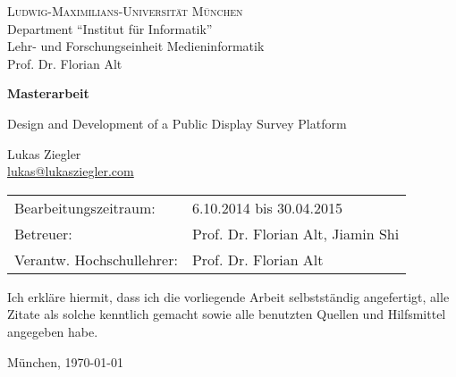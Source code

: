 \documentclass[11pt,a4paper,twoside]{article}
\begin{document}
\pagestyle{empty} %

\begin{center}
\textsc{Ludwig-Maximilians-Universit\"at M\"unchen}\\
Department ``Institut f\"ur Informatik''\\
Lehr- und Forschungseinheit Medieninformatik\\
Prof. Dr. Florian Alt

\vspace{5cm}
{\large\textbf{Masterarbeit}}\vspace{.5cm}

\vspace{2cm}
{\huge Design and Development of a Public Display Survey Platform}
\vspace{2cm}

{\large Lukas Ziegler}\\\href{mailto:lukas@lukasziegler.com}{lukas@lukasziegler.com}

\end{center}
\vfill

\begin{tabular}{ll}
Bearbeitungszeitraum: & 6.10.2014 bis 30.04.2015\\
Betreuer: & Prof. Dr. Florian Alt, Jiamin Shi\\
Verantw. Hochschullehrer: & Prof. Dr. Florian Alt
\end{tabular}

\cleardoublepage

    


\cleardoublepage

    


\cleardoublepage

    

    \vfill %

    \noindent Ich erkl\"are hiermit, dass ich die vorliegende Arbeit
    selbstst\"andig angefertigt, alle Zitate als solche kenntlich gemacht
    sowie alle benutzten Quellen und Hilfsmittel angegeben habe.

    \bigskip\noindent M\"unchen, \today

    \vspace{4ex}\noindent\makebox[7cm]{\dotfill}


\cleardoublepage
\end{document}
